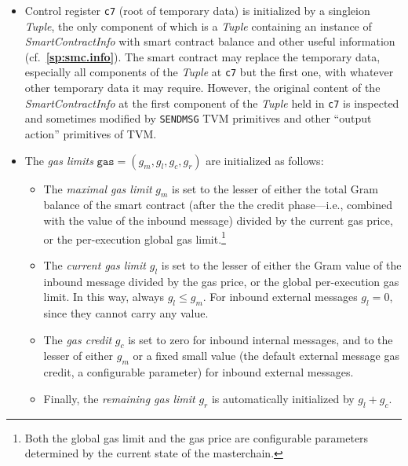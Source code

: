 \documentclass[12pt,oneside]{article}
\def\refpoint#1{{\rm\textbf{\ref{#1}}}}
\let\ptref=\refpoint
\begin{document}
\begin{itemize}
\item Control register {\tt c7} (root of temporary data) is initialized by a singleion {\em Tuple}, the only component of which is a {\em Tuple\/} containing an instance of {\em SmartContractInfo\/} with smart contract balance and other useful information (cf.~\ptref{sp:smc.info}). The smart contract may replace the temporary data, especially all components of the {\em Tuple\/} at {\tt c7} but the first one, with whatever other temporary data it may require. However, the original content of the {\em SmartContractInfo\/} at the first component of the {\em Tuple\/} held in {\tt c7} is inspected and sometimes modified by {\tt SENDMSG} TVM primitives and other ``output action'' primitives of TVM.
\item The {\em gas limits\/} $\texttt{gas}=(g_m,g_l,g_c,g_r)$ are initialized as follows:
  \begin{itemize}
  \item The {\em maximal gas limit\/} $g_m$ is set to the lesser of either the total Gram balance of the smart contract (after the the credit phase---i.e., combined with the value of the inbound message) divided by the current gas price, or the per-execution global gas limit.\footnote{Both the global gas limit and the gas price are configurable parameters determined by the current state of the masterchain.}
  \item The {\em current gas limit\/} $g_l$ is set to the lesser of either the Gram value of the inbound message divided by the gas price, or the global per-execution gas limit. In this way, always $g_l\leq g_m$. For inbound external messages $g_l=0$, since they cannot carry any value.
  \item The {\em gas credit\/} $g_c$ is set to zero for inbound internal messages, and to the lesser of either $g_m$ or a fixed small value (the default external message gas credit, a configurable parameter) for inbound external messages.
  \item Finally, the {\em remaining gas limit\/} $g_r$ is automatically initialized by $g_l+g_c$.
  \end{itemize}
\end{itemize}
\end{document}
